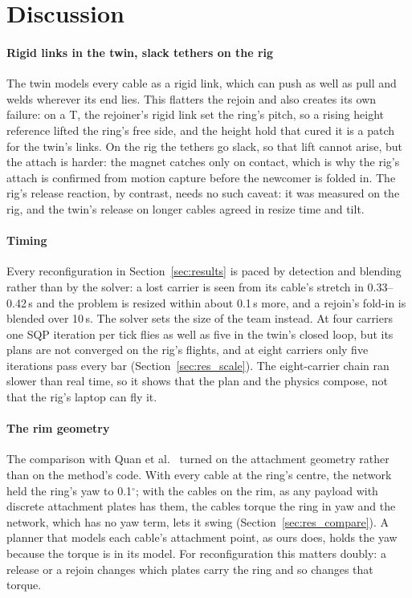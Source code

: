 \section{Discussion}
\label{sec:discussion}

\paragraph{Rigid links in the twin, slack tethers on the rig}
The twin models every cable as a rigid link, which can push as well as pull and welds wherever its end lies. This
flatters the rejoin and also creates its own failure: on a T, the rejoiner's rigid link set the ring's pitch, so a
rising height reference lifted the ring's free side, and the height hold that cured it is a patch for the twin's
links. On the rig the tethers go slack, so that lift cannot arise, but the attach is harder: the magnet catches only on
contact, which is why the rig's attach is confirmed from motion capture before the newcomer is folded in. The rig's
release reaction, by contrast, needs no such caveat: it was measured on the rig, and the twin's release on longer
cables agreed in resize time and tilt.

\paragraph{Timing}
Every reconfiguration in Section~\ref{sec:results} is paced by detection and blending rather than by the solver: a
lost carrier is seen from its cable's stretch in 0.33--0.42\,s and the problem is resized within about 0.1\,s more,
and a rejoin's fold-in is blended over 10\,s. The solver sets the size of the team instead. At four carriers one SQP
iteration per tick flies as well as five in the twin's closed loop, but its plans are not converged on the rig's
flights, and at eight carriers only five iterations pass every bar (Section~\ref{sec:res_scale}). The eight-carrier
chain ran slower than real time, so it shows that the plan and the physics compose, not that the rig's laptop can fly
it.

\paragraph{The rim geometry}
The comparison with Quan et al.~\cite{quan2025swarm} turned on the attachment geometry rather than on the method's
code. With every cable at the ring's centre, the network held the ring's yaw to 0.1$^\circ$; with the cables on the
rim, as any payload with discrete attachment plates has them, the cables torque the ring in yaw and the network,
which has no yaw term, lets it swing (Section~\ref{sec:res_compare}). A planner that models each cable's attachment
point, as ours does, holds the yaw because the torque is in its model. For reconfiguration this matters doubly: a
release or a rejoin changes which plates carry the ring and so changes that torque.


